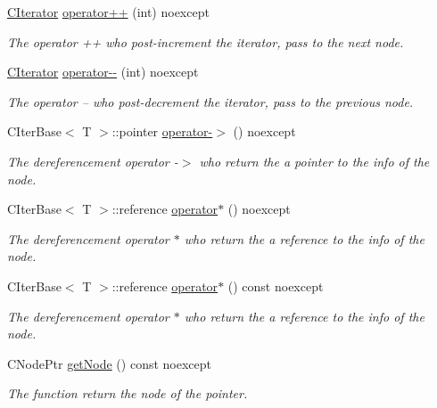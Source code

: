\begin{DoxyCompactItemize}
\hyperlink{structnsSdD_1_1CList_1_1CIterator}{C\+Iterator} \hyperlink{structnsSdD_1_1CList_1_1CIterator_a8304ea60a13fc7818d943241934e8169}{operator++} (int) noexcept
\begin{DoxyCompactList}\small\item\em The operator ++ who post-\/increment the iterator, pass to the next node. \end{DoxyCompactList}\item 
\hyperlink{structnsSdD_1_1CList_1_1CIterator}{C\+Iterator} \hyperlink{structnsSdD_1_1CList_1_1CIterator_a3a74d1ce68a46e0d9d63130b5340a09b}{operator-\/-\/} (int) noexcept
\begin{DoxyCompactList}\small\item\em The operator -- who post-\/decrement the iterator, pass to the previous node. \end{DoxyCompactList}\item 
C\+Iter\+Base$<$ T $>$\+::pointer \hyperlink{structnsSdD_1_1CList_1_1CIterator_a36b69ff32014bb4669c18c8da9e10d65}{operator-\/$>$} () noexcept
\begin{DoxyCompactList}\small\item\em The dereferencement operator -\/$>$ who return the a pointer to the info of the node. \end{DoxyCompactList}\item 
C\+Iter\+Base$<$ T $>$\+::reference \hyperlink{structnsSdD_1_1CList_1_1CIterator_aecbfd6f490eb99c310ef9b57b8df9ea6}{operator$\ast$} () noexcept
\begin{DoxyCompactList}\small\item\em The dereferencement operator $\ast$ who return the a reference to the info of the node. \end{DoxyCompactList}\item 
C\+Iter\+Base$<$ T $>$\+::reference \hyperlink{structnsSdD_1_1CList_1_1CIterator_aa9995f10a811b8d3c49f9799a8d42170}{operator$\ast$} () const noexcept
\begin{DoxyCompactList}\small\item\em The dereferencement operator $\ast$ who return the a reference to the info of the node. \end{DoxyCompactList}\item 
C\+Node\+Ptr \hyperlink{structnsSdD_1_1CList_1_1CIterator_a9c99745d084ce7e1fa1b304fd527e9e7}{get\+Node} () const noexcept
\begin{DoxyCompactList}\small\item\em The function return the node of the pointer. \end{DoxyCompactList}\end{DoxyCompactItemize}


